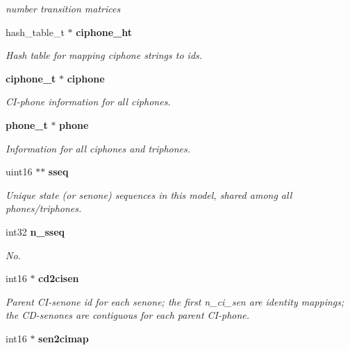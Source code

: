 \begin{DoxyCompactItemize}
\begin{DoxyCompactList}\small\item\em number transition matrices \end{DoxyCompactList}\item 
hash\+\_\+table\+\_\+t $\ast$ {\bf ciphone\+\_\+ht}\label{structmdef__t_a1091b9f34193255ccf6038d75523187b}

\begin{DoxyCompactList}\small\item\em Hash table for mapping ciphone strings to ids. \end{DoxyCompactList}\item 
{\bf ciphone\+\_\+t} $\ast$ {\bf ciphone}\label{structmdef__t_aae4a51202b87f71394b6c5b3138b77c7}

\begin{DoxyCompactList}\small\item\em C\+I-\/phone information for all ciphones. \end{DoxyCompactList}\item 
{\bf phone\+\_\+t} $\ast$ {\bf phone}\label{structmdef__t_a2b9aaf78e5648fe14655d1fe8da5f164}

\begin{DoxyCompactList}\small\item\em Information for all ciphones and triphones. \end{DoxyCompactList}\item 
uint16 $\ast$$\ast$ {\bf sseq}\label{structmdef__t_a2472170a66d451d2d4873a9a6e64adc7}

\begin{DoxyCompactList}\small\item\em Unique state (or senone) sequences in this model, shared among all phones/triphones. \end{DoxyCompactList}\item 
int32 {\bf n\+\_\+sseq}
\begin{DoxyCompactList}\small\item\em No. \end{DoxyCompactList}\item 
int16 $\ast$ {\bf cd2cisen}\label{structmdef__t_ae2ba90b39a79603022daae3c9270a0b7}

\begin{DoxyCompactList}\small\item\em Parent C\+I-\/senone id for each senone; the first n\+\_\+ci\+\_\+sen are identity mappings; the C\+D-\/senones are contiguous for each parent C\+I-\/phone. \end{DoxyCompactList}\item 
int16 $\ast$ {\bf sen2cimap}\label{structmdef__t_a4aafd791a1e1adaa9b5b28bf0cfbd624}


\end{DoxyCompactItemize}
